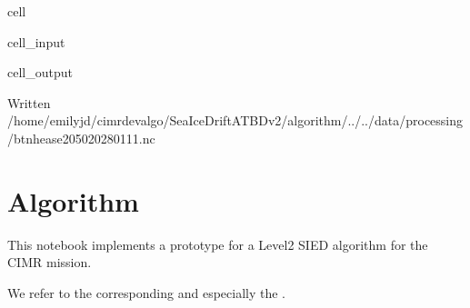 \documentclass[letterpaper,10pt,english]{jupyterBook}
\begin{document}
\begin{sphinxuseclass}{cell}
\begin{sphinxVerbatimInput}
\begin{sphinxuseclass}{cell_input}
\begin{sphinxVerbatim}[commandchars=\\\{\}]
    
  
\end{sphinxVerbatim}

\end{sphinxuseclass}\end{sphinxVerbatimInput}
\begin{sphinxVerbatimOutput}

\begin{sphinxuseclass}{cell_output}
\begin{sphinxVerbatim}[commandchars=\\\{\}]
Written /home/emilyjd/cimr\PYGZhy{}devalgo/SeaIceDrift\PYGZus{}ATBD\PYGZus{}v2/algorithm/../../data/processing/bt\PYGZus{}nh\PYGZhy{}ease2\PYGZhy{}050\PYGZus{}20280111.nc
\end{sphinxVerbatim}

\end{sphinxuseclass}\end{sphinxVerbatimOutput}

\end{sphinxuseclass}
\sphinxstepscope


\chapter{Algorithm}
\label{\detokenize{CIMR_L2_Sea_Ice_Drift_algorithm:algorithm}}\label{\detokenize{CIMR_L2_Sea_Ice_Drift_algorithm::doc}}
\sphinxAtStartPar
This notebook implements a prototype for a Level\sphinxhyphen{}2 SIED algorithm for the CIMR mission.

\sphinxAtStartPar
We refer to the corresponding  and especially the .
\end{document}
